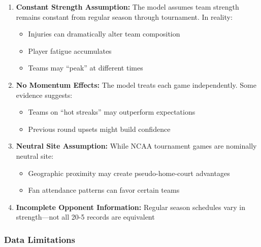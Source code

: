 \documentclass[
]{article}
\providecommand{\tightlist}{%
  \setlength{\itemsep}{0pt}\setlength{\parskip}{0pt}}
\begin{document}
\begin{enumerate}
\def\labelenumi{\arabic{enumi}.}
\tightlist
\item
  \textbf{Constant Strength Assumption:} The model assumes team strength
  remains constant from regular season through tournament. In reality:

  \begin{itemize}
  \tightlist
  \item
    Injuries can dramatically alter team composition
  \item
    Player fatigue accumulates
  \item
    Teams may ``peak'' at different times
  \end{itemize}
\item
  \textbf{No Momentum Effects:} The model treats each game
  independently. Some evidence suggests:

  \begin{itemize}
  \tightlist
  \item
    Teams on ``hot streaks'' may outperform expectations
  \item
    Previous round upsets might build confidence
  \end{itemize}
\item
  \textbf{Neutral Site Assumption:} While NCAA tournament games are
  nominally neutral site:

  \begin{itemize}
  \tightlist
  \item
    Geographic proximity may create pseudo-home-court advantages
  \item
    Fan attendance patterns can favor certain teams
  \end{itemize}
\item
  \textbf{Incomplete Opponent Information:} Regular season schedules
  vary in strength---not all 20-5 records are equivalent
\end{enumerate}

\subsubsection{Data Limitations}\label{data-limitations}
\end{document}
